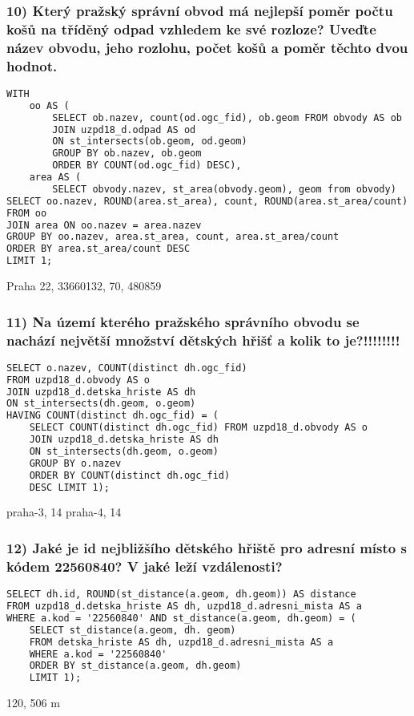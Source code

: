 \documentclass[a4paper, 12pt]{article}
\begin{document}
\subsubsection*{10) Který pražský správní obvod má nejlepší poměr počtu košů na tříděný odpad vzhledem ke své rozloze? Uveďte název obvodu, jeho rozlohu, počet košů a poměr těchto dvou hodnot.}
\begin{lstlisting}[language=html]
WITH 
    oo AS (
        SELECT ob.nazev, count(od.ogc_fid), ob.geom FROM obvody AS ob
        JOIN uzpd18_d.odpad AS od 
        ON st_intersects(ob.geom, od.geom)
        GROUP BY ob.nazev, ob.geom
        ORDER BY COUNT(od.ogc_fid) DESC),
    area AS (
        SELECT obvody.nazev, st_area(obvody.geom), geom from obvody)
SELECT oo.nazev, ROUND(area.st_area), count, ROUND(area.st_area/count) AS ratio 
FROM oo
JOIN area ON oo.nazev = area.nazev
GROUP BY oo.nazev, area.st_area, count, area.st_area/count
ORDER BY area.st_area/count DESC
LIMIT 1;
\end{lstlisting}
Praha 22, 33660132, 70, 480859
\vspace{0.8cm}

\subsubsection*{11) Na území kterého pražského správního obvodu se nachází největší množství dětských hřišť a kolik to je?!!!!!!!!}
\begin{lstlisting}[language=html]
SELECT o.nazev, COUNT(distinct dh.ogc_fid) 
FROM uzpd18_d.obvody AS o 
JOIN uzpd18_d.detska_hriste AS dh 
ON st_intersects(dh.geom, o.geom) 
HAVING COUNT(distinct dh.ogc_fid) = (
    SELECT COUNT(distinct dh.ogc_fid) FROM uzpd18_d.obvody AS o 
    JOIN uzpd18_d.detska_hriste AS dh 
    ON st_intersects(dh.geom, o.geom) 
    GROUP BY o.nazev 
    ORDER BY COUNT(distinct dh.ogc_fid) 
    DESC LIMIT 1);
\end{lstlisting}
\begin{flushleft}
praha-3, 14 \linebreak
praha-4, 14
\end{flushleft}

\subsubsection*{12) Jaké je id nejbližšího dětského hřiště pro adresní místo s kódem 22560840? V jaké leží vzdálenosti?}
\begin{lstlisting}[language=html]
SELECT dh.id, ROUND(st_distance(a.geom, dh.geom)) AS distance 
FROM uzpd18_d.detska_hriste AS dh, uzpd18_d.adresni_mista AS a
WHERE a.kod = '22560840' AND st_distance(a.geom, dh.geom) = (
    SELECT st_distance(a.geom, dh. geom) 
    FROM detska_hriste AS dh, uzpd18_d.adresni_mista AS a
    WHERE a.kod = '22560840' 
    ORDER BY st_distance(a.geom, dh.geom)
    LIMIT 1);
\end{lstlisting}
120, 506 m
\vspace{0.8cm}
\end{document}
